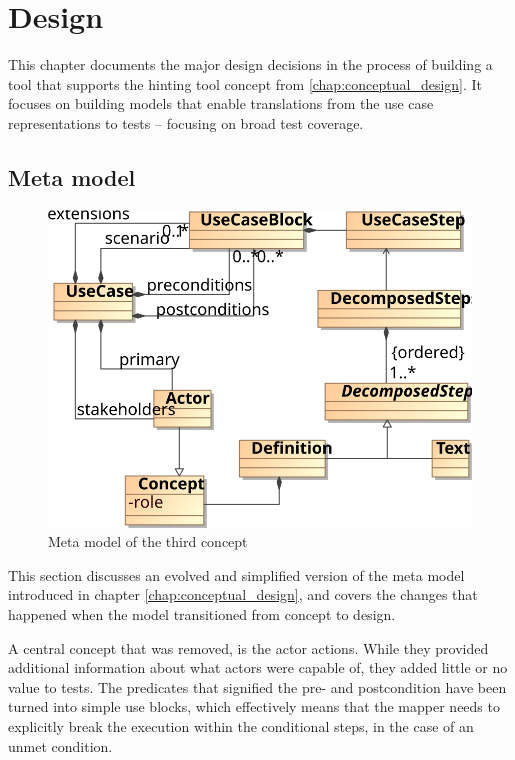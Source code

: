 \chapter{Design}
\label{ch:design}
This chapter documents the major design decisions in the process of building a tool that supports the hinting tool concept from \ref{chap:conceptual_design}. It focuses on building models that enable translations from the use case representations to tests -- focusing on broad test coverage.

\section{Meta model}
\begin{figure}[!htbp]
  \centering
  \includegraphics[scale=0.9]{img/3rd_iteration_meta_model}
  \caption{Meta model of the third concept}
  \label{fig:3rd_iteration_meta_model}
\end{figure}
\noindent This section discusses an evolved and simplified version of the meta model introduced in chapter \ref{chap:conceptual_design}, and covers the changes that happened when the model transitioned from concept to design.\medskip

\noindent A central concept that was removed, is the actor actions. While they provided additional information about what actors were capable of, they added little or no value to tests. The predicates that signified the pre- and postcondition have been turned into simple use blocks, which effectively means that the mapper needs to explicitly break the execution within the conditional steps, in the case of an unmet condition.\medskip

